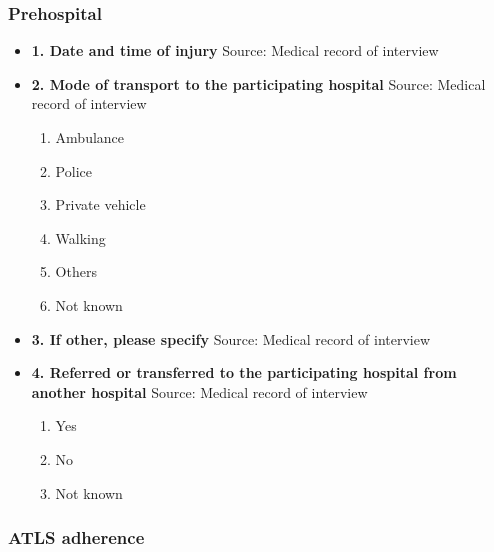 \documentclass[
]{scrartcl}
\providecommand{\tightlist}{%
  \setlength{\itemsep}{0pt}\setlength{\parskip}{0pt}}\usepackage{longtable,booktabs,array}
\begin{document}
\hypertarget{prehospital}{%
\subsubsection{Prehospital}\label{prehospital}}

\begin{itemize}
\item
  \textbf{1. Date and time of injury} Source: Medical record of
  interview
\item
  \textbf{2. Mode of transport to the participating hospital} Source:
  Medical record of interview

  \begin{enumerate}
  \def\labelenumi{\arabic{enumi}.}
  \tightlist
  \item
    Ambulance
  \item
    Police
  \item
    Private vehicle
  \item
    Walking
  \item
    Others
  \item
    Not known
  \end{enumerate}
\item
  \textbf{3. If other, please specify} Source: Medical record of
  interview
\item
  \textbf{4. Referred or transferred to the participating hospital from
  another hospital} Source: Medical record of interview

  \begin{enumerate}
  \def\labelenumi{\arabic{enumi}.}
  \tightlist
  \item
    Yes
  \item
    No
  \item
    Not known
  \end{enumerate}
\end{itemize}

\hypertarget{atls-adherence}{%
\subsubsection{ATLS adherence}\label{atls-adherence}}
\end{document}
